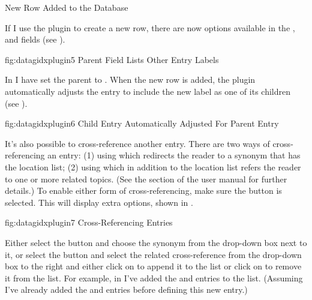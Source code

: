 \begin{example}
 {%
 }
 {New Row Added to the Database}

   If I use the  plugin to create a new row,
   there are now options available in the 
   , 
    and 
    fields 
   (see ).

\FloatFig
 {fig:datagidxplugin5}
 {%
 }
 {Parent Field Lists Other Entry Labels}

   In  I have set the parent to 
   . When the new row is added, the plugin automatically adjusts
   the  entry to include the new  label as one of its
   children (see ).

\FloatFig
 {fig:datagidxplugin6}
 {%
 }
 {Child Entry Automatically Adjusted For Parent Entry}


   It's also possible to cross-reference another entry. There are two ways
   of cross-referencing an entry: (1) using 
   which redirects the reader to a synonym that has the location list;
   (2) using  which in addition to the
   location list refers the reader to one or more related topics. (See the
    section of the  user manual
   for further details.) To enable
   either form of cross-referencing, make sure the
    button is selected. This will 
   display extra options, shown in .

\FloatFig
 {fig:datagidxplugin7}
 {%
 }
 {Cross-Referencing Entries}

   Either select the  button and choose
   the synonym from the drop-down box next to it, or select the 
    button and select the related 
   cross-reference from the drop-down box to the right and either click on
    to append it to the 
    list or click on 
    to remove it from the list.
   For example, in  I've added the 
   and  entries to the 
   list. (Assuming I've already added the  and 
   entries before defining this new entry.)



\end{example}
